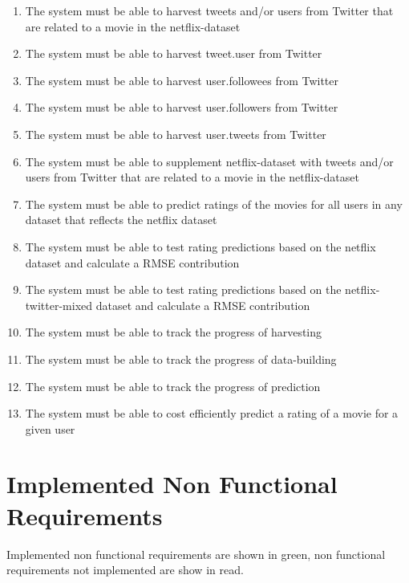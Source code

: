 \begin{enumerate}[label=\bfseries FR \arabic*:]
  \item {\color{OliveGreen}The system must be able to harvest tweets and/or users from Twitter that are related to a movie in the netflix-dataset}
  \item {\color{OliveGreen}The system must be able to harvest tweet.user from Twitter}
  \item {\color{OliveGreen}The system must be able to harvest user.followees from Twitter}
  \item {\color{RedOrange}The system must be able to harvest user.followers from Twitter}
  \item {\color{OliveGreen}The system must be able to harvest user.tweets from Twitter}
  \item {\color{RedOrange}The system must be able to supplement netflix-dataset with tweets and/or users from Twitter that are related to a movie in the netflix-dataset}
  \item {\color{RedOrange}The system must be able to predict ratings of the movies for all users in any dataset that reflects the netflix dataset}
  \item {\color{RedOrange}The system must be able to test rating predictions based on the netflix dataset and calculate a RMSE contribution}
  \item {\color{RedOrange}The system must be able to test rating predictions based on the netflix-twitter-mixed dataset and calculate a RMSE contribution}
  \item {\color{RedOrange}The system must be able to track the progress of harvesting}
  \item {\color{RedOrange}The system must be able to track the progress of data-building}
  \item {\color{RedOrange}The system must be able to track the progress of prediction}
  \item {\color{RedOrange}The system must be able to cost efficiently predict a rating of a movie for a given user}
\end{enumerate}

\section{Implemented Non Functional Requirements}
Implemented non functional requirements are shown in green, non functional requirements not implemented are show in read.

